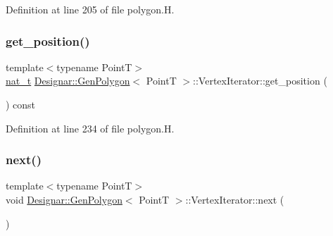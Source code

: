Definition at line 205 of file polygon.\+H.

\mbox{\label{class_designar_1_1_gen_polygon_1_1_vertex_iterator_a44f1777dd9aa54546cd497500a5232fb}} 
\subsubsection{\texorpdfstring{get\+\_\+position()}{get\_position()}}
{\footnotesize\ttfamily template$<$typename PointT$>$ \\
\hyperlink{namespace_designar_aa72662848b9f4815e7bf31a7cf3e33d1}{nat\+\_\+t} \hyperlink{class_designar_1_1_gen_polygon}{Designar\+::\+Gen\+Polygon}$<$ PointT $>$\+::Vertex\+Iterator\+::get\+\_\+position (\begin{DoxyParamCaption}{ }\end{DoxyParamCaption}) const\hspace{0.3cm}{\ttfamily [inline]}}



Definition at line 234 of file polygon.\+H.

\mbox{\label{class_designar_1_1_gen_polygon_1_1_vertex_iterator_a85d990ecb087c96de85b6743d0e2ab0b}} 
\subsubsection{\texorpdfstring{next()}{next()}}
{\footnotesize\ttfamily template$<$typename PointT$>$ \\
void \hyperlink{class_designar_1_1_gen_polygon}{Designar\+::\+Gen\+Polygon}$<$ PointT $>$\+::Vertex\+Iterator\+::next (\begin{DoxyParamCaption}{ }\end{DoxyParamCaption})\hspace{0.3cm}{\ttfamily [inline]}}



